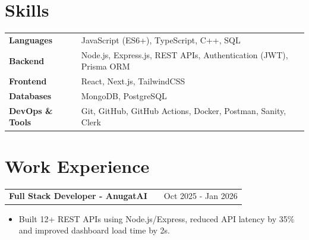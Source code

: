 \documentclass[a4paper,12pt]{article}
\makeatletter
\newenvironment{jobshort}[2]
    {
    \begin{tabularx}{\linewidth}{@{}l X r@{}}
    \textbf{#1} & \hfill &  #2 \\[3.75pt]
    \end{tabularx}
    }
    {
    }
\makeatother
\begin{document}
 \section{Skills}
\begin{tabularx}{\linewidth}{@{}l X@{}}

\textbf{Languages} & JavaScript (ES6+), TypeScript, C++, SQL \\

\textbf{Backend} & Node.js, Express.js, REST APIs, Authentication (JWT), Prisma ORM \\

\textbf{Frontend} & React, Next.js, TailwindCSS \\

\textbf{Databases} & MongoDB, PostgreSQL \\

\textbf{DevOps \& Tools} & Git, GitHub, GitHub Actions, Docker, Postman, Sanity, Clerk \\

\end{tabularx}

\section{Work Experience}

\begin{jobshort}{Full Stack Developer - AnugatAI}{Oct 2025 - Jan 2026}
\begin{itemize}
    \item Built 12+ REST APIs using Node.js/Express, reduced API latency by 35\% and improved dashboard load time by 2s.
\end{itemize}

\end{jobshort}


\end{document}
